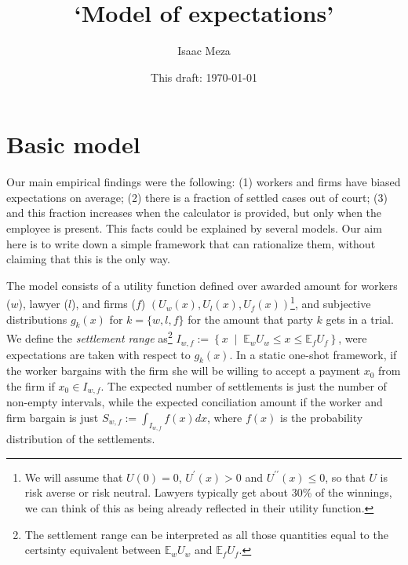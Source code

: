 \documentclass[10pt]{article}
\begin{document}
\title{`Model of expectations'}

\author{Isaac Meza}
\date{This draft: \today \\[2 cm] }

\maketitle


\section{Basic model}
Our main empirical findings were the following: (1) workers and firms have biased expectations on average; (2) there is a fraction of settled cases out of court; (3) and this fraction increases when the calculator is provided, but only when the employee is present. This facts could be explained by several models. Our aim here is to write down a simple framework that can rationalize them, without claiming that this is the only way.

The model consists of a utility function defined over awarded amount for workers ($w$), lawyer ($l$), and firms ($f$) $\left(U_w(x), U_l(x), U_f(x)\right)$\footnote{We will assume that $U(0)=0$, $U^{\prime}(x)>0$ and $U^{\prime\prime}(x)\leq 0$, so that $U$ is risk averse or risk neutral. Lawyers typically get about 30\% of the winnings, we can think of this as being already reflected in their utility function.}, and subjective distributions $g_k(x)$ for $k=\{w,l,f\}$ for the amount that party $k$ gets in a trial. We define the \emph{settlement range} as\footnote{The settlement range can be interpreted as all those quantities equal to the certsinty equivalent between $\mathbb{E}_wU_w$ and $\mathbb{E}_fU_f$.} $I_{w,f}:=\left\{x\;\;|\;\;\mathbb{E}_wU_w\leq x\leq\mathbb{E}_fU_f\right\}$, were expectations are taken with respect to $g_k(x)$. In a static one-shot framework, if the worker bargains with the firm she will be willing to accept a payment $x_0$ from the firm if $x_0 \in I_{w,f}$. The expected number of settlements is just the number of non-empty intervals, while the expected conciliation amount if the worker and firm bargain is just $S_{w,f}:=\int_{I_{w,f}} f(x) dx$, where $f(x)$ is the probability distribution of the settlements.
\end{document}

